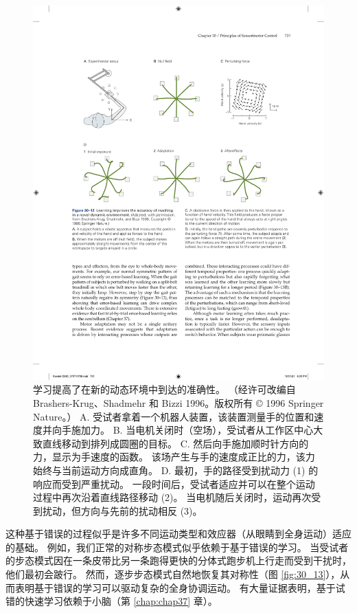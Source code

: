 \begin{figure}[htbp]
	\centering
	\includegraphics[width=0.85\linewidth]{chap30/fig_30_12}
	\caption{学习提高了在新的动态环境中到达的准确性。 （经许可改编自 Brashers-Krug、Shadmehr 和 Bizzi 1996。版权所有 © 1996 Springer Nature。） A. 受试者拿着一个机器人装置，该装置测量手的位置和速度并向手施加力。 B. 当电机关闭时（空场），受试者从工作区中心大致直线移动到排列成圆圈的目标。 C. 然后向手施加顺时针方向的力，显示为手速度的函数。 该场产生与手的速度成正比的力，该力始终与当前运动方向成直角。 D. 最初，手的路径受到扰动力 (1) 的响应而受到严重扰动。 一段时间后，受试者适应并可以在整个运动过程中再次沿着直线路径移动 (2)。 当电机随后关闭时，运动再次受到扰动，但方向与先前的扰动相反 (3)。}
	\label{fig:30_12}
\end{figure}


这种基于错误的过程似乎是许多不同运动类型和效应器（从眼睛到全身运动）适应的基础。
例如，我们正常的对称步态模式似乎依赖于基于错误的学习。
当受试者的步态模式因在一条皮带比另一条跑得更快的分体式跑步机上行走而受到干扰时，他们最初会跛行。
然而，逐步步态模式自然地恢复其对称性（图 \ref{fig:30_13}），从而表明基于错误的学习可以驱动复杂的全身协调运动。 
有大量证据表明，基于试错的快速学习依赖于小脑（第 \ref{chap:chap37} 章）。


